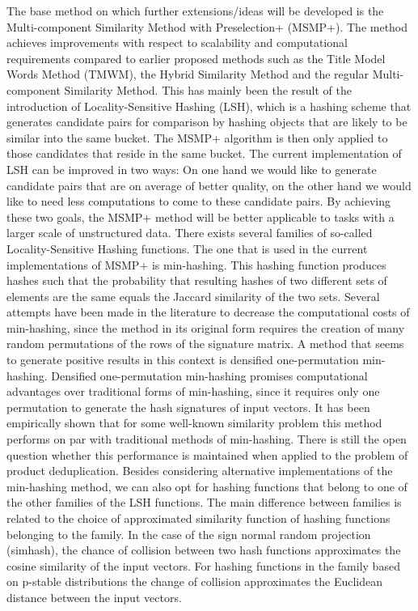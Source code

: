 The base method on which further extensions/ideas will be developed is the Multi-component Similarity Method with Preselection+ (MSMP+). The method achieves improvements with respect to scalability and computational requirements compared to earlier proposed methods such as the Title Model Words Method (TMWM), the Hybrid Similarity Method and the regular Multi-component Similarity Method. This has mainly been the result of the introduction of Locality-Sensitive Hashing (LSH), which is a hashing scheme that generates candidate pairs for comparison by hashing objects that are likely to be similar into the same bucket. The MSMP+ algorithm is then only applied to those candidates that reside in the same bucket.
The current implementation of LSH can be improved in two ways: On one hand we would like to generate candidate pairs that are on average of better quality, on the other hand we would like to need less computations to come to these candidate pairs. By achieving these two goals, the MSMP+ method will be better applicable to tasks with a larger scale of unstructured data.
There exists several families of so-called Locality-Sensitive Hashing functions. The one that is used in the current implementations of MSMP+ is min-hashing. This hashing function produces hashes such that the probability that resulting hashes of two different sets of elements are the same equals the Jaccard similarity of the two sets. Several attempts have been made in the literature to decrease the computational costs of min-hashing, since the method in its original form requires the creation of many random permutations of the rows of the signature matrix. A method that seems to generate positive results in this context is densified one-permutation min-hashing. Densified one-permutation min-hashing promises computational advantages over traditional forms of min-hashing, since it requires only one permutation to generate the hash signatures of input vectors. It has been empirically shown that for some well-known similarity problem this method performs on par with traditional methods of min-hashing. There is still the open question whether this performance is maintained when applied to the problem of product deduplication.
Besides considering alternative implementations of the min-hashing method, we can also opt for hashing functions that belong to one of the other families of the LSH functions. The main difference between families is related to the choice of approximated similarity function of hashing functions belonging to the family. In the case of the sign normal random projection (simhash), the chance of collision between two hash functions approximates the cosine similarity of the input vectors. For hashing functions in the family based on p-stable distributions the change of collision approximates the Euclidean distance between the input vectors.  

